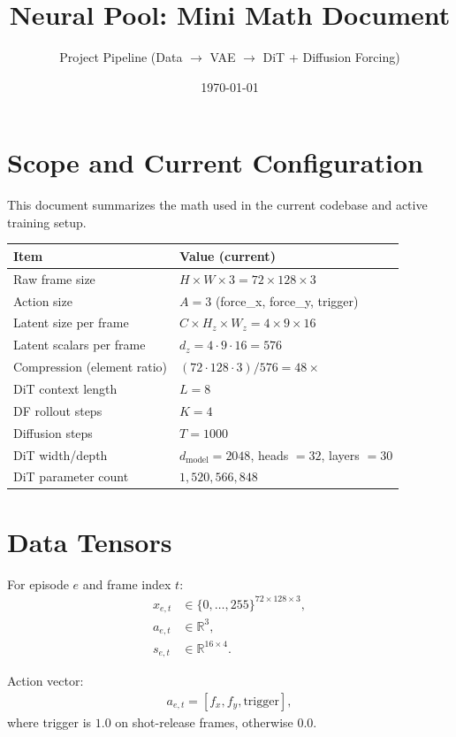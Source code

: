\documentclass[11pt]{article}
\title{Neural Pool: Mini Math Document}
\author{Project Pipeline (Data $\rightarrow$ VAE $\rightarrow$ DiT + Diffusion Forcing)}
\date{\today}
\begin{document}
\maketitle

\section{Scope and Current Configuration}
This document summarizes the math used in the current codebase and active training setup.

\begin{center}
\begin{tabular}{ll}
\toprule
Item & Value (current) \\
\midrule
Raw frame size & $H \times W \times 3 = 72 \times 128 \times 3$ \\
Action size & $A = 3$ (force\_x, force\_y, trigger) \\
Latent size per frame & $C \times H_z \times W_z = 4 \times 9 \times 16$ \\
Latent scalars per frame & $d_z = 4 \cdot 9 \cdot 16 = 576$ \\
Compression (element ratio) & $(72 \cdot 128 \cdot 3)/576 = 48\times$ \\
DiT context length & $L = 8$ \\
DF rollout steps & $K = 4$ \\
Diffusion steps & $T = 1000$ \\
DiT width/depth & $d_{\text{model}}=2048$, heads $=32$, layers $=30$ \\
DiT parameter count & $1{,}520{,}566{,}848$ \\
\bottomrule
\end{tabular}
\end{center}

\section{Data Tensors}
For episode $e$ and frame index $t$:
\begin{align}
x_{e,t} &\in \{0,\ldots,255\}^{72 \times 128 \times 3}, \\
a_{e,t} &\in \mathbb{R}^{3}, \\
s_{e,t} &\in \mathbb{R}^{16 \times 4}.
\end{align}

Action vector:
\begin{align}
a_{e,t} = [f_x, f_y, \text{trigger}],
\end{align}
where trigger is $1.0$ on shot-release frames, otherwise $0.0$.
\end{document}
